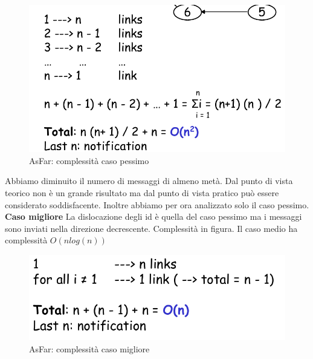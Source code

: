 \documentclass[12pt]{article}
\begin{document}
			\begin{figure}[h!]
				\centering
				\includegraphics[scale=0.30]{img/ascom.png}
				\caption{AsFar: complessità caso pessimo}
			\end{figure}
			Abbiamo diminuito il numero di messaggi di almeno metà. Dal punto di vista teorico non è un grande risultato ma dal punto di vista pratico può essere considerato soddisfacente. Inoltre abbiamo per ora analizzato solo il caso pessimo.\\
			\textbf{Caso migliore}
			La dislocazione degli id è quella del caso pessimo ma i messaggi sono inviati nella direzione decrescente. Complessità in figura. Il caso medio ha complessità $O(nlog(n))$
			\begin{figure}[h!]
				\centering
				\includegraphics[scale=0.30]{img/asbest.png}
				\caption{AsFar: complessità caso migliore}
			\end{figure}
		
\end{document}
